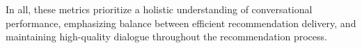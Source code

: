 In all, these metrics prioritize a holistic understanding of conversational performance, emphasizing balance between efficient recommendation delivery, and maintaining high-quality dialogue throughout the recommendation process.



















